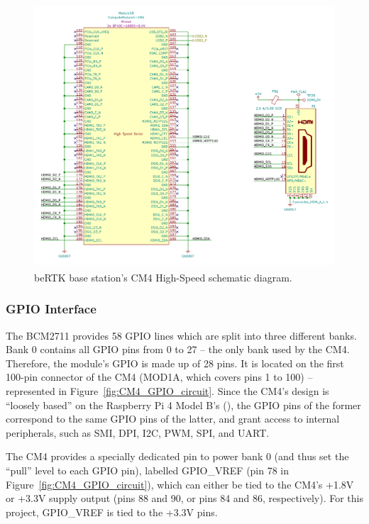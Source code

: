 \begin{figure}[h]
	\centering
	\includegraphics[width=1.0\textwidth]{Chapters/Figures/chapter3/CM4_HighSpeed.pdf}
	\caption{beRTK\textsuperscript{\textregistered} base station's CM4 High-Speed schematic diagram.}
	\label{fig:CM4_HighSpeed_circuit}
\end{figure}


\subsubsection{GPIO Interface}\label{sec:3222_CM4_GPIO}

The BCM2711 provides 58 GPIO lines which are split into three different banks. Bank 0 contains all GPIO pins from 0 to 27 -- the only bank used by the CM4. Therefore, the module's GPIO is made up of 28 pins. It is located on the first 100-pin connector of the CM4 (MOD1A, which covers pins 1 to 100) -- represented in Figure~\ref{fig:CM4_GPIO_circuit}. Since the CM4's design is ``loosely based'' on the Raspberry Pi 4 Model B's (\cite{CM4}), the GPIO pins of the former correspond to the same GPIO pins of the latter, and grant access to internal peripherals, such as SMI, DPI, I2C, PWM, SPI, and UART.

The CM4 provides a specially dedicated pin to power bank 0 (and thus set the ``pull'' level to each GPIO pin), labelled GPIO\_VREF (pin 78 in Figure~\ref{fig:CM4_GPIO_circuit}), which can either be tied to the CM4's +1.8V or +3.3V supply output (pins 88 and 90, or pins 84 and 86, respectively). For this project, GPIO\_VREF is tied to the +3.3V pins.

